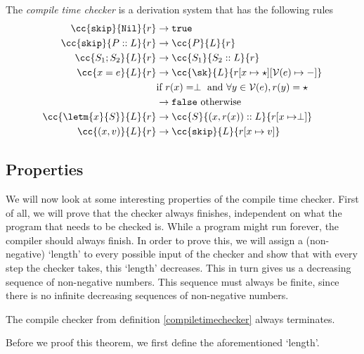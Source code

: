 \begin{definition}
\label{compiletimechecker}
The \emph{compile time checker} is a derivation system that has the following rules
\begin{align*}
\cc{\texttt{skip}}{\texttt{Nil}}{r} & \to \texttt{true}  \\
\cc{\texttt{skip}} {P::L}{ r}       & \to \cc{P}{L}{r}  \\
\cc{S_1; S_2}{L}{r}                 & \to \cc{S_1}{S_2::L}{r}  \\
\cc{x=e}{L}{r}                     & \to \cc{\sk}{L}{r[x\mapsto \star][\mathcal{V}(e) \mapsto -]} \\
                                    & \textrm{if }r(x) = \perp \textrm{ and } \forall y \in \mathcal{V}(e), r(y) = \star \\
                                    & \to \texttt{false} \textrm{ otherwise}\\
\cc{\letm{x}{S}}{L}{r} & \to \cc{S}{(x,r(x))::L}{r[x\mapsto \perp]} \\
\cc{(x,v)}{L}{r}                    & \to \cc{\texttt{skip}}{L}{r[x \mapsto v]}
\end{align*}
\end{definition}

\subsection{Properties}
We will now look at some interesting properties of the compile time checker. First of all, we will prove that the checker always finishes, independent on what the program that needs to be checked is. While a program might run forever, the compiler should always finish. In order to prove this, we will assign a (non-negative) `length' to every possible input of the checker and show that with every step the checker takes, this `length' decreases. This in turn gives us a decreasing sequence of non-negative numbers. This sequence must always be finite, since there is no infinite decreasing sequences of non-negative numbers. 

\begin{theorem}
\label{termination}
The compile checker from definition \ref{compiletimechecker} always terminates.
\end{theorem}

Before we proof this theorem, we first define the aforementioned `length'. 


